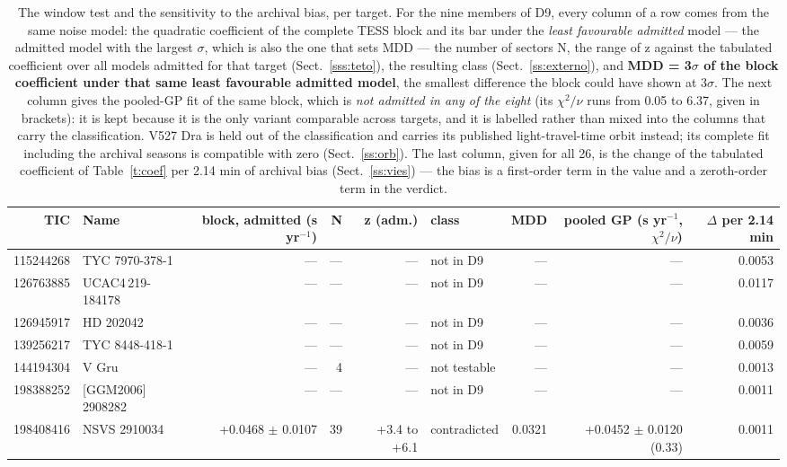 \documentclass{aa}
\begin{document}
\begin{table}
\caption{The window test and the sensitivity to the archival bias, per target. For the nine members of D9, every column of a row comes from the same noise model: the quadratic coefficient of the complete TESS block and its bar under the \textit{least favourable admitted} model --- the admitted model with the largest $\sigma$, which is also the one that sets MDD --- the number of sectors N, the range of z against the tabulated coefficient over all models admitted for that target (Sect.~\ref{sss:teto}), the resulting class (Sect.~\ref{ss:externo}), and \textbf{MDD = 3$\sigma$ of the block coefficient under that same least favourable admitted model}, the smallest difference the block could have shown at 3$\sigma$. The next column gives the pooled-GP fit of the same block, which is \textit{not admitted in any of the eight} (its $\chi^2/\nu$ runs from 0.05 to 6.37, given in brackets): it is kept because it is the only variant comparable across targets, and it is labelled rather than mixed into the columns that carry the classification. V527 Dra is held out of the classification and carries its published light-travel-time orbit instead; its complete fit including the archival seasons is compatible with zero (Sect.~\ref{ss:orb}). The last column, given for all 26, is the change of the tabulated coefficient of Table~\ref{t:coef} per 2.14 min of archival bias (Sect.~\ref{ss:vies}) --- the bias is a first-order term in the value and a zeroth-order term in the verdict.}
\label{t:janela}
\centering
\scriptsize
\begin{tabular}{r l r r r l r r r}
\hline\hline
TIC & Name & block, admitted (s yr$^{-1}$) & N & z (adm.) & class & MDD & pooled GP (s yr$^{-1}$, $\chi^2/\nu$) & $\Delta$ per 2.14 min\\
\hline
115244268 & TYC 7970-378-1 & --- & --- & --- & not in D9 & --- & --- & 0.0053\\
126763885 & UCAC4\,219-184178 & --- & --- & --- & not in D9 & --- & --- & 0.0117\\
126945917 & HD 202042 & --- & --- & --- & not in D9 & --- & --- & 0.0036\\
139256217 & TYC 8448-418-1 & --- & --- & --- & not in D9 & --- & --- & 0.0059\\
144194304 & V Gru & --- & 4 & --- & not testable & --- & --- & 0.0013\\
198388252 & [GGM2006] 2908282 & --- & --- & --- & not in D9 & --- & --- & 0.0011\\
198408416 & NSVS 2910034 & +0.0468 $\pm$ 0.0107 & 39 & +3.4 to +6.1 & contradicted & 0.0321 & +0.0452 $\pm$ 0.0120 (0.33) & 0.0011\\

\end{tabular}
\end{table}
\end{document}
